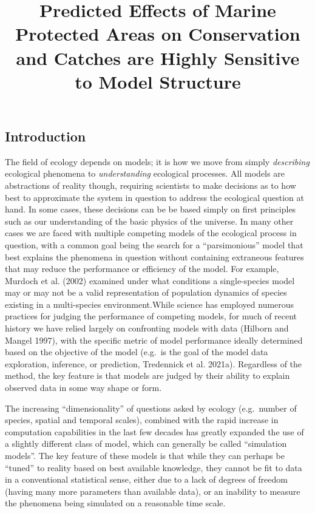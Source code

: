 \documentclass[
  default,
  lineno,
  referee]{sn-jnl}
\title[Predicted Effects of Marine Protected Areas on Conservation and
Catches are Highly Sensitive to Model Structure]{Predicted Effects of
Marine Protected Areas on Conservation and Catches are Highly Sensitive
to Model Structure}
\author*[1]{\fnm{Daniel} \sur{Ovando}}\email{dovando@iattc.org}\equalcont{These authors contributed equally to this work.}
\affil[1]{\orgdiv{Ecosystem \& Bycatch Group}, \orgname{Inter-American
Tropical Tuna Commission}, \orgaddress{\street{8901 La Jolla Shores
Drive}, \city{La Jolla}, \postcode{92037}}}
\renewcommand*\contentsname{Table of contents}
\newcommand\contentsname{Table of contents}
\begin{document}
\maketitle

\renewcommand*\contentsname{Table of contents}
{
\hypersetup{linkcolor=}
\setcounter{tocdepth}{3}
\tableofcontents
}
\subsection{Introduction}\label{introduction}

The field of ecology depends on models; it is how we move from simply
\emph{describing} ecological phenomena to \emph{understanding}
ecological processes. All models are abstractions of reality though,
requiring scientists to make decisions as to how best to approximate the
system in question to address the ecological question at hand. In some
cases, these decisions can be be based simply on first principles such
as our understanding of the basic physics of the universe. In many other
cases we are faced with multiple competing models of the ecological
process in question, with a common goal being the search for a
``parsimonious'' model that best explains the phenomena in question
without containing extraneous features that may reduce the performance
or efficiency of the model. For example, Murdoch et al. (2002) examined
under what conditions a single-species model may or may not be a valid
representation of population dynamics of species existing in a
multi-species environment.While science has employed numerous practices
for judging the performance of competing models, for much of recent
history we have relied largely on confronting models with data (Hilborn
and Mangel 1997), with the specific metric of model performance ideally
determined based on the objective of the model (e.g.~is the goal of the
model data exploration, inference, or prediction, Tredennick et al.
2021a). Regardless of the method, the key feature is that models are
judged by their ability to explain observed data in some way shape or
form.

The increasing ``dimensionality'' of questions asked by ecology
(e.g.~number of species, spatial and temporal scales), combined with the
rapid increase in computation capabilities in the last few decades has
greatly expanded the use of a slightly different class of model, which
can generally be called ``simulation models''. The key feature of these
models is that while they can perhaps be ``tuned'' to reality based on
best available knowledge, they cannot be fit to data in a conventional
statistical sense, either due to a lack of degrees of freedom (having
many more parameters than available data), or an inability to measure
the phenomena being simulated on a reasonable time scale.
\end{document}
